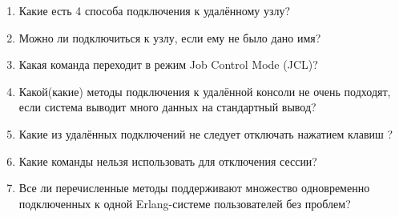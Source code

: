 \documentclass[11pt, oneside]{book}   	%
\begin{document}
\begin{enumerate}
	\item Какие есть 4 способа подключения к удалённому узлу?
	\item Можно ли подключиться к узлу, если ему не было дано имя?
	\item Какая команда переходит в режим Job Control Mode (JCL)?
	\item Какой(какие) методы подключения к удалённой консоли не очень подходят, если система выводит много данных на стандартный вывод?
	\item Какие из удалённых подключений не следует отключать нажатием клавиш ?
	\item Какие команды нельзя использовать для отключения сессии?
	\item Все ли перечисленные методы поддерживают множество одновременно подключенных к одной Erlang-системе пользователей без проблем?
\end{enumerate}
\end{document}
